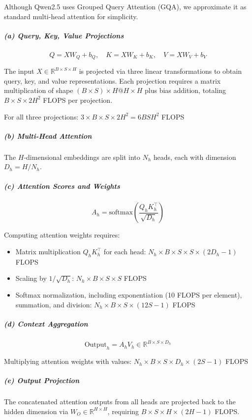 \documentclass[11pt]{article}
\begin{document}
Although Qwen2.5 uses Grouped Query Attention (GQA), we approximate it as standard multi-head attention for simplicity. 

\subparagraph{(a) Query, Key, Value Projections}
\begin{equation}
    Q = XW_Q + b_Q,\quad K = XW_K + b_K,\quad V = XW_V + b_V
\end{equation}

The input $X \in \mathbb{R}^{B \times S \times H}$ is projected via three linear transformations to obtain query, key, and value representations. Each projection requires a matrix multiplication of shape $(B\times S)\times H @ H \times H$ plus bias addition, totaling $B \times S \times 2H^2$ FLOPS per projection.

For all three projections: $3 \times B \times S \times 2H^2 = 6BSH^2$ FLOPS

\subparagraph{(b) Multi-Head Attention}
The $H$-dimensional embeddings are split into $N_h$ heads, each with dimension $D_h = H/N_h$.

\subparagraph{(c) Attention Scores and Weights}
\begin{equation}
    A_h = \text{softmax}\left( \frac{Q_h K_h^\top}{\sqrt{D_h}} \right)
\end{equation}

Computing attention weights requires:
\begin{itemize}
    \item Matrix multiplication $Q_h K_h^\top$ for each head: $N_h \times B \times S \times S \times (2D_h - 1)$ FLOPS
    \item Scaling by $1/\sqrt{D_h}$: $N_h \times B \times S \times S$ FLOPS
    \item Softmax normalization, including exponentiation (10 FLOPS per element), summation, and division: $N_h \times B \times S \times (12S - 1)$ FLOPS
\end{itemize}

\subparagraph{(d) Context Aggregation}
\begin{equation}
    \text{Output}_h = A_h V_h \in \mathbb{R}^{B \times S \times D_h}
\end{equation}

Multiplying attention weights with values: $N_h \times B \times S \times D_h \times (2S - 1)$ FLOPS

\subparagraph{(e) Output Projection}
The concatenated attention outputs from all heads are projected back to the hidden dimension via $W_O \in \mathbb{R}^{H \times H}$, requiring $B \times S \times H \times (2H - 1)$ FLOPS.
\end{document}
